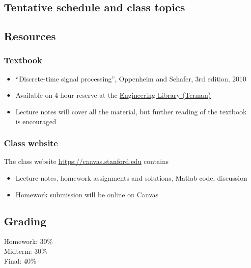 \documentclass[10pt]{article}
\begin{document}
\subsection*{Tentative schedule and class topics}




\subsection*{Resources}

\subsubsection*{Textbook}
\begin{itemize}
	\item ``Discrete-time signal processing'', Oppenheim and Schafer, 3rd edition, 2010
	\item Available on 4-hour reserve at the \href{https://campus-map.stanford.edu/?id=04-080&lat=37.42787956&lng=-122.17429865&zoom=17&srch=engineeri}{Engineering Library (Terman)}
	\item Lecture notes will cover all the material, but further reading of the textbook is encouraged
\end{itemize}

\subsubsection*{Class website}

The class website \href{https://canvas.stanford.edu}{https://canvas.stanford.edu} contains

\begin{itemize}
	\item Lecture notes, homework assignments and solutions, Matlab code, discussion
	\item Homework submission will be online on Canvas
\end{itemize}

\subsection*{Grading}
Homework: $30\%$ \\
Midterm: $30\%$ \\
Final: $40\%$ 
\end{document}
